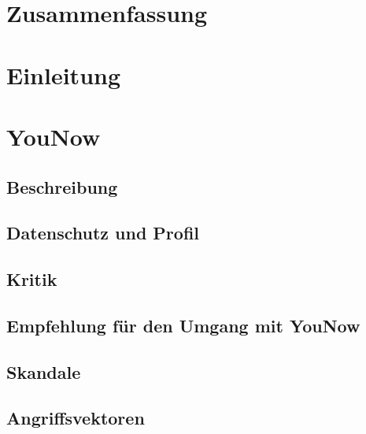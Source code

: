 \documentclass[a4paper,12pt]{scrartcl}
\begin{document}


\tableofcontents %
\pagebreak

\section{Zusammenfassung}



\section{Einleitung}



\section{YouNow}
\subsection{Beschreibung}

\subsection{Datenschutz und Profil}

\subsection{Kritik}

\subsection{Empfehlung für den Umgang mit YouNow}

\subsection{Skandale}


\subsection{Angriffsvektoren}

\end{document}
